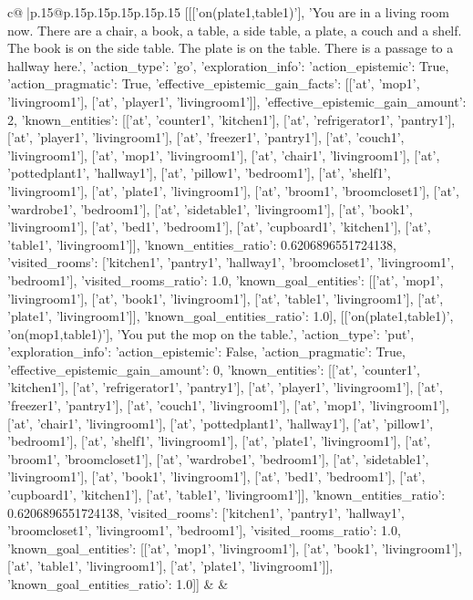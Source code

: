 \documentclass{article}
\begin{document}
{\begin{supertabular}{c@{$\;$}|p{.15\linewidth}@{}p{.15\linewidth}p{.15\linewidth}p{.15\linewidth}p{.15\linewidth}p{.15\linewidth}}
{{{	 [[['on(plate1,table1)'], 'You are in a living room now. There are a chair, a book, a table, a side table, a plate, a couch and a shelf. The book is on the side table. The plate is on the table. There is a passage to a hallway here.', {'action_type': 'go', 'exploration_info': {'action_epistemic': True, 'action_pragmatic': True, 'effective_epistemic_gain_facts': [['at', 'mop1', 'livingroom1'], ['at', 'player1', 'livingroom1']], 'effective_epistemic_gain_amount': 2, 'known_entities': [['at', 'counter1', 'kitchen1'], ['at', 'refrigerator1', 'pantry1'], ['at', 'player1', 'livingroom1'], ['at', 'freezer1', 'pantry1'], ['at', 'couch1', 'livingroom1'], ['at', 'mop1', 'livingroom1'], ['at', 'chair1', 'livingroom1'], ['at', 'pottedplant1', 'hallway1'], ['at', 'pillow1', 'bedroom1'], ['at', 'shelf1', 'livingroom1'], ['at', 'plate1', 'livingroom1'], ['at', 'broom1', 'broomcloset1'], ['at', 'wardrobe1', 'bedroom1'], ['at', 'sidetable1', 'livingroom1'], ['at', 'book1', 'livingroom1'], ['at', 'bed1', 'bedroom1'], ['at', 'cupboard1', 'kitchen1'], ['at', 'table1', 'livingroom1']], 'known_entities_ratio': 0.6206896551724138, 'visited_rooms': ['kitchen1', 'pantry1', 'hallway1', 'broomcloset1', 'livingroom1', 'bedroom1'], 'visited_rooms_ratio': 1.0, 'known_goal_entities': [['at', 'mop1', 'livingroom1'], ['at', 'book1', 'livingroom1'], ['at', 'table1', 'livingroom1'], ['at', 'plate1', 'livingroom1']], 'known_goal_entities_ratio': 1.0}}], [['on(plate1,table1)', 'on(mop1,table1)'], 'You put the mop on the table.', {'action_type': 'put', 'exploration_info': {'action_epistemic': False, 'action_pragmatic': True, 'effective_epistemic_gain_amount': 0, 'known_entities': [['at', 'counter1', 'kitchen1'], ['at', 'refrigerator1', 'pantry1'], ['at', 'player1', 'livingroom1'], ['at', 'freezer1', 'pantry1'], ['at', 'couch1', 'livingroom1'], ['at', 'mop1', 'livingroom1'], ['at', 'chair1', 'livingroom1'], ['at', 'pottedplant1', 'hallway1'], ['at', 'pillow1', 'bedroom1'], ['at', 'shelf1', 'livingroom1'], ['at', 'plate1', 'livingroom1'], ['at', 'broom1', 'broomcloset1'], ['at', 'wardrobe1', 'bedroom1'], ['at', 'sidetable1', 'livingroom1'], ['at', 'book1', 'livingroom1'], ['at', 'bed1', 'bedroom1'], ['at', 'cupboard1', 'kitchen1'], ['at', 'table1', 'livingroom1']], 'known_entities_ratio': 0.6206896551724138, 'visited_rooms': ['kitchen1', 'pantry1', 'hallway1', 'broomcloset1', 'livingroom1', 'bedroom1'], 'visited_rooms_ratio': 1.0, 'known_goal_entities': [['at', 'mop1', 'livingroom1'], ['at', 'book1', 'livingroom1'], ['at', 'table1', 'livingroom1'], ['at', 'plate1', 'livingroom1']], 'known_goal_entities_ratio': 1.0}}]] 
	  } 
	   } 
	   } 
	 & & \\ 
 


\end{supertabular}}
\end{document}
